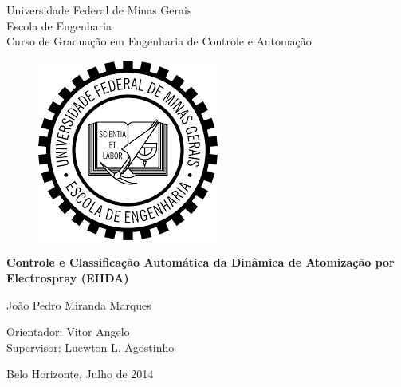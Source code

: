 \begin{titlepage}
\begin{center}
{\large Universidade Federal de Minas Gerais\\
Escola de Engenharia \\
Curso de Graduação em Engenharia de Controle e Automação\\}

\vspace{2cm}
\begin{figure}[h]
    \centering
    \includegraphics[scale=0.5]{Capa/Figuras/brasao_ufmg.png}
\end{figure}

\vspace{2cm}
{\bf\Large Controle e Classificação Automática da Dinâmica de Atomização por Electrospray (EHDA)}
\vspace{4cm}

{\large João Pedro Miranda Marques}
\vspace{2cm}  
   
\vspace{2cm}          
{\large Orientador: Vitor Angelo}\\
{\large Supervisor: Luewton L. Agostinho}

\vfill
{\large Belo Horizonte, Julho de 2014 }
\end{center}

\end{titlepage}

\newpage
\clearpage
\thispagestyle{empty}


